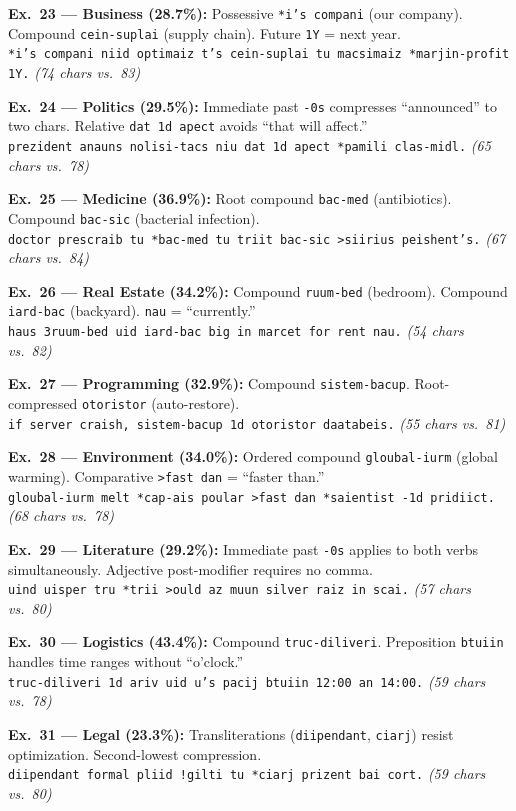 \documentclass[10pt,onecolumn,letterpaper]{article}
\newcommand{\me}[1]{\texttt{#1}}
\begin{document}
\textbf{Ex.~23 --- Business (28.7\%):} Possessive \me{*i's compani} (our company). Compound \me{cein-suplai} (supply chain). Future \me{1Y} = next year.\\
\me{*i's compani niid optimaiz t's cein-suplai tu macsimaiz *marjin-profit 1Y.} \textit{(74 chars vs.\ 83)}

\textbf{Ex.~24 --- Politics (29.5\%):} Immediate past \me{-0s} compresses ``announced'' to two chars. Relative \me{dat 1d apect} avoids ``that will affect.''\\
\me{prezident anauns nolisi-tacs niu dat 1d apect *pamili clas-midl.} \textit{(65 chars vs.\ 78)}

\textbf{Ex.~25 --- Medicine (36.9\%):} Root compound \me{bac-med} (antibiotics). Compound \me{bac-sic} (bacterial infection).\\
\me{doctor prescraib tu *bac-med tu triit bac-sic >siirius peishent's.} \textit{(67 chars vs.\ 84)}

\textbf{Ex.~26 --- Real Estate (34.2\%):} Compound \me{ruum-bed} (bedroom). Compound \me{iard-bac} (backyard). \me{nau} = ``currently.''\\
\me{haus 3ruum-bed uid iard-bac big in marcet for rent nau.} \textit{(54 chars vs.\ 82)}

\textbf{Ex.~27 --- Programming (32.9\%):} Compound \me{sistem-bacup}. Root-compressed \me{otoristor} (auto-restore).\\
\me{if server craish, sistem-bacup 1d otoristor daatabeis.} \textit{(55 chars vs.\ 81)}

\textbf{Ex.~28 --- Environment (34.0\%):} Ordered compound \me{gloubal-iurm} (global warming). Comparative \me{>fast dan} = ``faster than.''\\
\me{gloubal-iurm melt *cap-ais poular >fast dan *saientist -1d pridiict.} \textit{(68 chars vs.\ 78)}

\textbf{Ex.~29 --- Literature (29.2\%):} Immediate past \me{-0s} applies to both verbs simultaneously. Adjective post-modifier requires no comma.\\
\me{uind uisper tru *trii >ould az muun silver raiz in scai.} \textit{(57 chars vs.\ 80)}

\textbf{Ex.~30 --- Logistics (43.4\%):} Compound \me{truc-diliveri}. Preposition \me{btuiin} handles time ranges without ``o'clock.''\\
\me{truc-diliveri 1d ariv uid u's pacij btuiin 12:00 an 14:00.} \textit{(59 chars vs.\ 78)}

\textbf{Ex.~31 --- Legal (23.3\%):} Transliterations (\me{diipendant}, \me{ciarj}) resist optimization. Second-lowest compression.\\
\me{diipendant formal pliid !gilti tu *ciarj prizent bai cort.} \textit{(59 chars vs.\ 80)}
\end{document}
